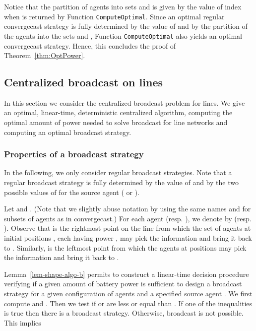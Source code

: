 \documentclass{article}
\newcommand\CompOptimal{\mbox{{\tt ComputeOptimal}}\xspace}
\newcommand\broadcast{broadcast\xspace}
\newcommand\Cbcast{Centralized broadcast\xspace}
\begin{document}
Notice that the partition of agents into sets  and  is given by the value of index  when  is returned by Function
\CompOptimal.
Since an optimal regular convergecast strategy is fully determined by the value of  and by the partition of the agents into the sets  and , Function \CompOptimal also yields an optimal convergecast strategy. Hence, this concludes the proof of Theorem~\ref{thm:OptPower}.
\vspace{-0.2cm}


\subsection{{\Cbcast} on lines}\label{s:line-b}

In this section we consider the centralized {\broadcast} problem
for lines. We give an optimal, linear-time, deterministic centralized
algorithm, computing the optimal amount of power needed to solve
{\broadcast} for line networks and computing an optimal broadcast strategy. 






\subsubsection{Properties of a {\broadcast} strategy}\label{sec-properties-b}

In the following, we only consider regular broadcast strategies. Note that a
regular broadcast strategy is fully determined by the value of  and by 
the two possible values of  for the source agent  ( or ). 

Let  and . (Note that we slightly abuse notation by using the same names  and  for subsets of agents as in convergecast.)
For each agent   (resp.  ), we denote  by
 (resp. ). Observe that
 is the rightmost point on the line from which the set
of  agents at initial positions , each having power ,
may pick the information and bring it back to . Similarly,
 is the leftmost point from which the agents at positions
 may pick the information and bring it back to .







Lemma~\ref{lem-shape-algo-b} permits to construct a linear-time decision
procedure verifying if a given amount  of battery power is
sufficient to design a broadcast strategy for a given configuration
 of agents and a specified source agent .  We first compute  and . 
Then we test if  or   are less or equal than .
If one of the inequalities is true then there is a broadcast strategy. Otherwise, broadcast is not possible. This implies
\end{document}

